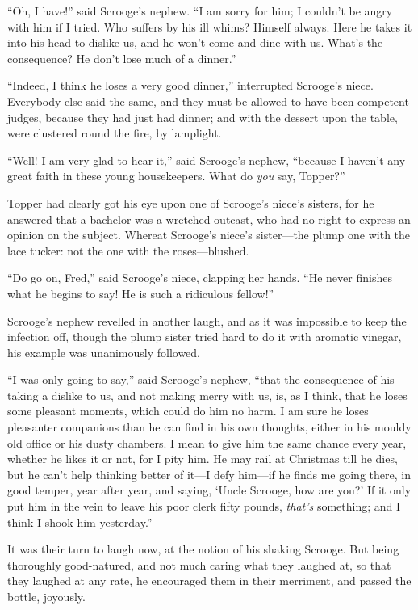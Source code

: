 \documentclass[paper=a5,BCOR=15mm,twoside,DIV=15,headinclude=off,12pt,chapterprefix=off,openany,headings=huge]{scrbook} %
\begin{document}
\enquote{Oh, I have!} said Scrooge's nephew. \enquote{I am sorry for him; I couldn't be angry with him if I tried. Who suffers by his ill whims? Himself always. Here he takes it into his head to dislike us, and he won't come and dine with us. What's the consequence? He don't lose much of a dinner.}

\enquote{Indeed, I think he loses a very good dinner,} interrupted Scrooge's niece. Everybody else said the same, and they must be allowed to have been competent judges, because they had just had dinner; and with the dessert upon the table, were clustered round the fire, by lamplight.

\enquote{Well! I am very glad to hear it,} said Scrooge's nephew, \enquote{because I haven't any great faith in these young housekeepers. What do \textit{you} say, Topper?}

Topper had clearly got his eye upon one of Scrooge's niece's sisters, for he answered that a bachelor was a wretched outcast, who had no right to express an opinion on the subject. Whereat Scrooge's niece's sister—the plump one with the lace tucker: not the one with the roses—blushed.

\enquote{Do go on, Fred,} said Scrooge's niece, clapping her hands. \enquote{He never finishes what he begins to say! He is such a ridiculous fellow!}

Scrooge's nephew revelled in another laugh, and as it was impossible to keep the infection off, though the plump sister tried hard to do it with aromatic vinegar, his example was unanimously followed.

\enquote{I was only going to say,} said Scrooge's nephew, \enquote{that the consequence of his taking a dislike to us, and not making merry with us, is, as I think, that he loses some pleasant moments, which could do him no harm. I am sure he loses pleasanter companions than he can find in his own thoughts, either in his mouldy old office or his dusty chambers. I mean to give him the same chance every year, whether he likes it or not, for I pity him. He may rail at Christmas till he dies, but he can't help thinking better of it—I defy him—if he finds me going there, in good temper, year after year, and saying, \enquote{Uncle Scrooge, how are you?} If it only put him in the vein to leave his poor clerk fifty pounds, \textit{that's} something; and I think I shook him yesterday.}

It was their turn to laugh now, at the notion of his shaking Scrooge. But being thoroughly good-natured, and not much caring what they laughed at, so that they laughed at any rate, he encouraged them in their merriment, and passed the bottle, joyously.
\end{document}
